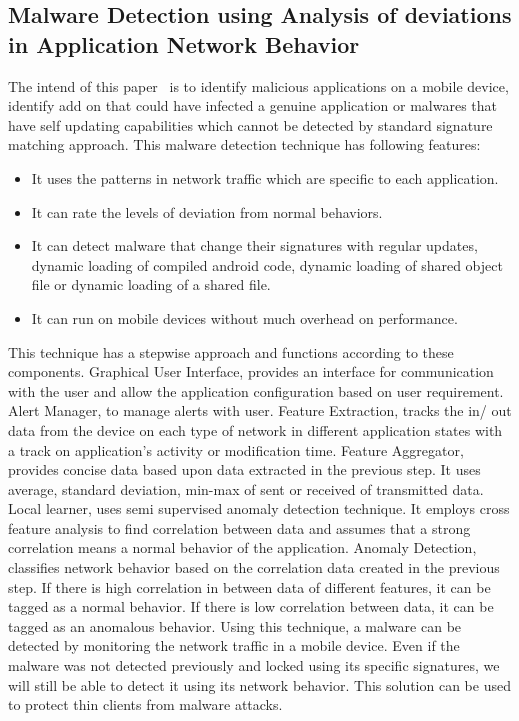 \documentclass[11pt]{article}
\begin{document}
	\subsection{Malware Detection using Analysis of deviations in Application Network Behavior}
	The intend of this paper~\cite{shabtai2014mobile} is to identify malicious applications on a mobile device, identify add on that could have infected a genuine application or malwares that have self updating capabilities which cannot be detected by standard signature matching approach. This malware detection technique has following features:
	\begin{itemize}
		\item It uses the patterns in network traffic which are specific to each application.
		\item It can rate the levels of deviation from normal behaviors.
		\item It can detect malware that change their signatures with regular updates, dynamic loading of compiled android code, dynamic loading of shared object file or dynamic loading of a shared file.
		\item It can run on mobile devices without much overhead on performance.
	\end{itemize}
	This technique has a stepwise approach and functions according to these components. Graphical User Interface, provides an interface for communication with the user and allow the application configuration based on user requirement. Alert Manager, to manage alerts with user. Feature Extraction, tracks the in/ out data from the device on each type of network in different application states with a track on application’s activity or modification time. Feature Aggregator, provides concise data based upon data extracted in the previous step. It uses average, standard deviation, min-max of sent or received of transmitted data. Local learner, uses semi supervised anomaly detection technique. It employs cross feature analysis to find correlation between data and assumes that a strong correlation means a normal behavior of the application. Anomaly Detection, classifies network behavior based on the correlation data created in the previous step. If there is high correlation in between data of different features, it can be tagged as a normal behavior. If there is low correlation between data, it can be tagged as an anomalous behavior.
	Using this technique, a malware can be detected by monitoring the network traffic in a mobile device. Even if the malware was not detected previously and locked using its specific signatures, we will still be able to detect it using its network behavior. This solution can be used to protect thin clients from malware attacks.
	
\end{document}
